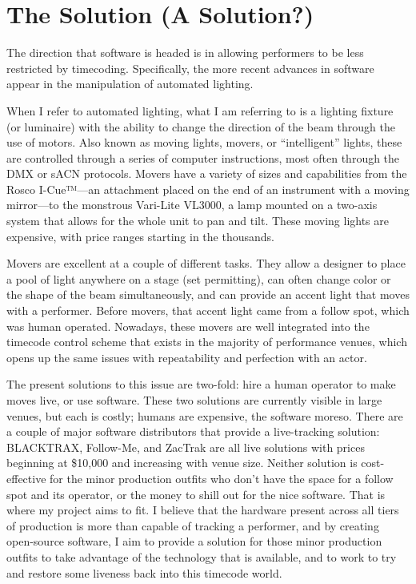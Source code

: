 \documentclass[
    12pt,
    twoside,
    bibstyle=chicago,
    headerstyle=uppercase,
	bibfile=thesis_updating.bib
]{reedthesis}
\begin{document}
\section{The Solution (A Solution?)}
The direction that software is headed is in allowing performers to be less restricted by timecoding. Specifically, the more recent advances in software appear in the manipulation of automated lighting. 

When I refer to automated lighting, what I am referring to is a lighting fixture (or luminaire) with the ability to change the direction of the beam through the use of motors. Also known as moving lights, movers, or “intelligent” lights, these are controlled through a series of computer instructions, most often through the DMX or sACN protocols. Movers have a variety of sizes and capabilities from the Rosco I-Cue™---an attachment placed on the end of an instrument with a moving mirror---to the monstrous Vari-Lite VL3000, a lamp mounted on a two-axis system that allows for the whole unit to pan and tilt. These moving lights are expensive, with price ranges starting in the thousands.

Movers are excellent at a couple of different tasks. They allow a designer to place a pool of light anywhere on a stage (set permitting), can often change color or the shape of the beam simultaneously, and can provide an accent light that moves with a performer. Before movers, that accent light came from a follow spot, which was human operated. Nowadays, these movers are well integrated into the timecode control scheme that exists in the majority of performance venues, which opens up the same issues with repeatability and perfection with an actor. 

The present solutions to this issue are two-fold: hire a human operator to make moves live, or use software. These two solutions are currently visible in large venues, but each is costly; humans are expensive, the software moreso. There are a couple of major software distributors that provide a live-tracking solution: BLACKTRAX, Follow-Me, and ZacTrak are all live solutions with prices beginning at \$10,000 and increasing with venue size. Neither solution is cost-effective for the minor production outfits who don’t have the space for a follow spot and its operator, or the money to shill out for the nice software. That is where my project aims to fit. I believe that the hardware present across all tiers of production is more than capable of tracking a performer, and by creating open-source software, I aim to provide a solution for those minor production outfits to take advantage of the technology that is available, and to work to try and restore some liveness back into this timecode world.
\end{document}
